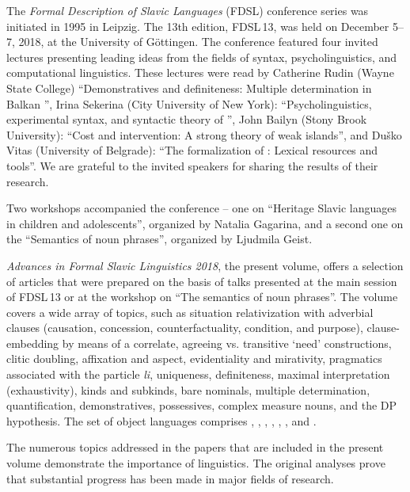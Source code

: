 % 
%
% 

The \textit{Formal Description of Slavic Languages} (FDSL) conference series was initiated in 1995 in Leipzig. The 13th edition, FDSL\,13, was held on December 5--7, 2018, at the University of Göttingen. The conference featured four invited lectures presenting leading ideas from the fields of syntax, psycholinguistics, and computational linguistics. These lectures were read by Catherine Rudin (Wayne State College) ``Demonstratives and definiteness: Multiple determination in Balkan '', Irina Sekerina (City University of New York): ``Psycholinguistics, experimental syntax, and syntactic theory of '', John Bailyn (Stony Brook University): ``Cost and intervention: A strong theory of weak islands'', and Duško Vitas (University of Belgrade): ``The formalization of : Lexical resources and tools''. We are grateful to the invited speakers for sharing the results of their research.

Two workshops accompanied the conference -- one on ``Heritage Slavic languages in children and adolescents'', organized by Natalia Gagarina, and a second one on the ``Semantics of noun phrases'', organized by Ljudmila Geist.

\textit{Advances in Formal Slavic Linguistics 2018}, the present volume, offers a selection of articles that were prepared on the basis of talks presented at the main session of FDSL\,13 or at the workshop on ``The semantics of noun phrases''. The volume covers a wide array of topics, such as situation relativization with adverbial clauses (causation, concession, counterfactuality, condition, and purpose), clause-embedding by means of a correlate, agreeing vs. transitive `need' constructions, clitic doubling, affixation and aspect, evidentiality and mirativity, pragmatics associated with the particle \textit{li}, uniqueness, definiteness, maximal interpretation (exhaustivity), kinds and subkinds, bare nominals, multiple determination, quantification, demonstratives, possessives, complex measure nouns, and the DP hypothesis. The set of object languages comprises , , , , , , and  .

The numerous topics addressed in the papers that are included in the present volume demonstrate the importance of  linguistics. The original analyses prove that substantial progress has been made in major fields of research.

